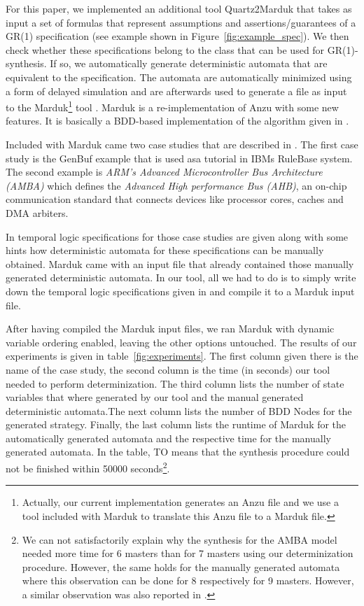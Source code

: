 \documentclass[submission,copyright,creativecommons]{eptcs}
\begin{document}
For this paper, we implemented an additional tool Quartz2Marduk that takes as input a set of \LTL{} formulas that represent assumptions and assertions/guarantees of a GR(1) specification (see example shown in Figure~\ref{fig:example_spec}). We then check whether these specifications belong to the class that can be used for GR(1)-synthesis. If so, we automatically generate deterministic automata that are equivalent to the specification. The automata are automatically minimized using a form of delayed simulation \cite{Frit05b} and are afterwards used to generate a file as input to the Marduk\footnote{Actually, our current implementation generates an Anzu \cite{JGWB07} file and we use a tool included with Marduk to translate this Anzu file to a Marduk file.} tool \cite{BCGH10a}. Marduk is a re-implementation of Anzu \cite{JGWB07} with some new features.
It is basically a BDD-based implementation of the algorithm given in \cite{PiPS06}.

Included with Marduk came two case studies that are described in \cite{BGJP07,BGJP07a,JGWB07}. The first case study is the GenBuf example that is used asa tutorial in IBMs RuleBase system. The second example is \emph{ARM's Advanced Microcontroller Bus Architecture (AMBA)} which defines the \emph{Advanced High performance Bus (AHB)}, an on-chip communication standard that connects devices like processor cores, caches and DMA arbiters.

In \cite{BGJP07,BGJP07a,JGWB07} temporal logic specifications for those case studies are given along with some hints how deterministic automata for these specifications can be manually obtained. Marduk came with an input file that already contained those manually generated deterministic automata. In our tool, all we had to do is to simply write down the temporal logic specifications given in \cite{BGJP07,BGJP07a,JGWB07} and compile it to a Marduk input file.

After having compiled the Marduk input files, we ran Marduk with dynamic variable ordering enabled, leaving the other options untouched. The results of our experiments is given in table~\ref{fig:experiments}. The first column given there is the name of the case study, the second column is the time (in seconds) our tool needed to perform determinization. The third column lists the number of state variables that where generated by our tool and the manual generated deterministic automata.The next column lists the number of BDD Nodes for the generated strategy. Finally, the last column lists the runtime of Marduk for the automatically generated automata and the respective time for the manually generated automata. In the table, TO means that the synthesis procedure could not be finished within 50000 seconds\footnote{We can not satisfactorily explain why the synthesis for the AMBA model needed more time for 6  masters than for 7 masters using our determinization procedure. However, the same holds for the manually generated automata where this observation can be done for 8 respectively for 9 masters. However, a similar observation was also reported in \cite{BGJP07a}.}.
\end{document}
